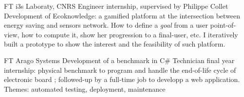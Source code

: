 \documentclass[10pt]{article} %
\begin{document}
\begin{paracol}{2}
{FT} %
{i3s Laboraty, CNRS} %
{Engineer internship, supervised by Philippe Collet} %
{Development of Ecoknowledge: a gamified platform at the intersection between energy saving and sensors network. How to define a \emph{goal} from a user point-of-view, how to compute it, show her progression to a final-user, etc. I iteratively built a prototype to show the interest and the feasibility of such platform.} %


{FT} %
{Arago Systems} %
{Development of a benchmark in C\#} %
{Technician final year internship: physical benchmark to program and handle the end-of-life cycle of electronic board ; followed-up by a full-time job to developp a web application. Themes: automated testing, deployment, maintenance} %



\vspace{-\baselineskip}\medskip %



\switchcolumn %



\end{paracol}
\end{document}

